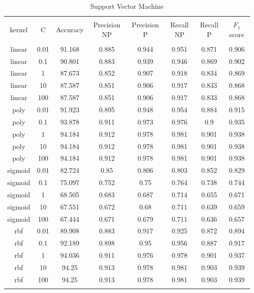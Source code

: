 \documentclass[journal,twocolumn]{IEEEtran}
\begin{document}
\begin{appendices}
\begin{table}[h]
\caption{Support Vector Machine}
\centering
\begin{tabular}{cccccccc}
\hline\\ [-1.5ex]
     kernel &    C & Accuracy & Precision NP & Precision P & Recall NP & Recall P & $F_1$ score\\ \hline\\ [-1.5ex]
  linear & 0.01 &  91.168 & 0.885 & 0.944 & 0.951 & 0.871 & 0.906\\
  linear &  0.1 &  90.801 & 0.883 & 0.939 & 0.946 & 0.869 & 0.902\\
  linear &    1 &  87.673 & 0.852 & 0.907 & 0.918 & 0.834 & 0.869\\
  linear &   10 &  87.587 & 0.851 & 0.906 & 0.917 & 0.833 & 0.868\\
  linear &  100 &  87.587 & 0.851 & 0.906 & 0.917 & 0.833 & 0.868\\ \hline
    poly & 0.01 &  91.923 & 0.895 & 0.948 & 0.954 & 0.884 & 0.915\\
    poly &  0.1 &  93.878 & 0.911 & 0.973 & 0.976 &   0.9 & 0.935\\
    poly &    1 &  94.184 & 0.912 & 0.978 & 0.981 & 0.901 & 0.938\\
    poly &   10 &  94.184 & 0.912 & 0.978 & 0.981 & 0.901 & 0.938\\
    poly &  100 &  94.184 & 0.912 & 0.978 & 0.981 & 0.901 & 0.938\\ \hline
 sigmoid & 0.01 &  82.724 &  0.85 & 0.806 & 0.803 & 0.852 & 0.829\\
 sigmoid &  0.1 &  75.097 & 0.752 &  0.75 & 0.764 & 0.738 & 0.744\\
 sigmoid &    1 &  68.505 & 0.683 & 0.687 & 0.714 & 0.655 & 0.671\\
 sigmoid &   10 &  67.551 & 0.672 &  0.68 & 0.711 & 0.639 & 0.659\\
 sigmoid &  100 &  67.444 & 0.671 & 0.679 & 0.711 & 0.636 & 0.657\\ \hline
     rbf & 0.01 &  89.908 & 0.883 & 0.917 & 0.925 & 0.872 & 0.894\\
     rbf &  0.1 &  92.189 & 0.898 &  0.95 & 0.956 & 0.887 & 0.917\\
     rbf &    1 &  94.036 & 0.911 & 0.976 & 0.978 & 0.901 & 0.937\\
     rbf &   10 &   94.25 & 0.913 & 0.978 & 0.981 & 0.903 & 0.939\\
     rbf &  100 &   94.25 & 0.913 & 0.978 & 0.981 & 0.903 & 0.939\\ \hline\\ [-1.5ex]
    \end{tabular}
\end{table}



\end{appendices}
\end{document}
